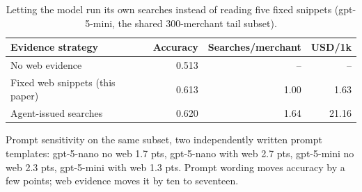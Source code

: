 \begin{table}[t]
\centering
\caption{Letting the model run its own searches instead of reading five fixed snippets (gpt-5-mini, the shared 300-merchant tail subset).}
\label{tab:agentic}
\begin{tabular}{lrrr}
\toprule
Evidence strategy & Accuracy & Searches/merchant & USD/1k\\
\midrule
No web evidence & 0.513 & -- & -- \\
Fixed web snippets (this paper) & 0.613 & 1.00 & 1.63 \\
Agent-issued searches & 0.620 & 1.64 & 21.16 \\
\bottomrule
\end{tabular}
\vspace{4pt}
\begin{minipage}{0.86\textwidth}\footnotesize Prompt sensitivity on the same subset, two independently written prompt templates: gpt-5-nano no web 1.7 pts, gpt-5-nano with web 2.7 pts, gpt-5-mini no web 2.3 pts, gpt-5-mini with web 1.3 pts. Prompt wording moves accuracy by a few points; web evidence moves it by ten to seventeen.\end{minipage}
\end{table}
